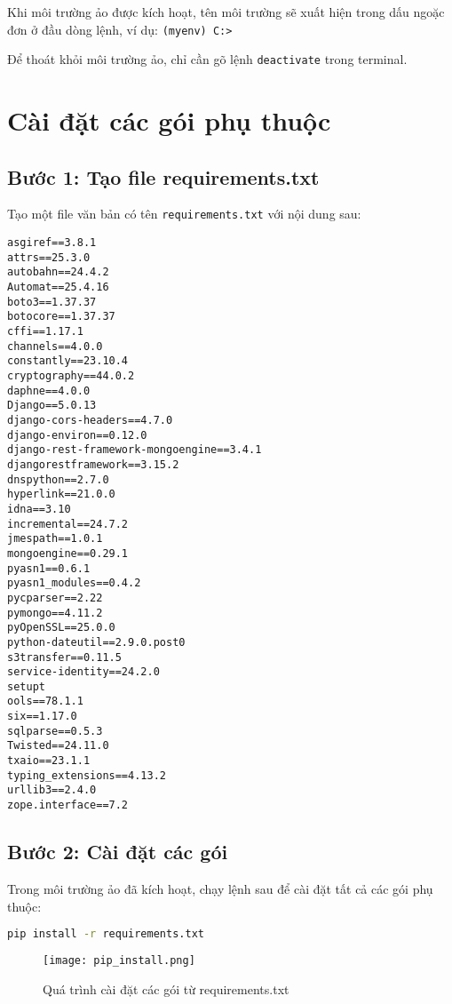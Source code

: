 \documentclass[12pt,a4paper]{article}
\begin{document}
Khi môi trường ảo được kích hoạt, tên môi trường sẽ xuất hiện trong dấu ngoặc đơn ở đầu dòng lệnh, ví dụ: \texttt{(myenv) C:\Users\username>}

\begin{tcolorbox}[colback=blue!5, colframe=blue!40!black, title=Mẹo]
Để thoát khỏi môi trường ảo, chỉ cần gõ lệnh \texttt{deactivate} trong terminal.
\end{tcolorbox}

\section{Cài đặt các gói phụ thuộc}

\subsection{Bước 1: Tạo file requirements.txt}

Tạo một file văn bản có tên \texttt{requirements.txt} với nội dung sau:

\begin{lstlisting}
asgiref==3.8.1
attrs==25.3.0
autobahn==24.4.2
Automat==25.4.16
boto3==1.37.37
botocore==1.37.37
cffi==1.17.1
channels==4.0.0
constantly==23.10.4
cryptography==44.0.2
daphne==4.0.0
Django==5.0.13
django-cors-headers==4.7.0
django-environ==0.12.0
django-rest-framework-mongoengine==3.4.1
djangorestframework==3.15.2
dnspython==2.7.0
hyperlink==21.0.0
idna==3.10
incremental==24.7.2
jmespath==1.0.1
mongoengine==0.29.1
pyasn1==0.6.1
pyasn1_modules==0.4.2
pycparser==2.22
pymongo==4.11.2
pyOpenSSL==25.0.0
python-dateutil==2.9.0.post0
s3transfer==0.11.5
service-identity==24.2.0
setupt
ools==78.1.1
six==1.17.0
sqlparse==0.5.3
Twisted==24.11.0
txaio==23.1.1
typing_extensions==4.13.2
urllib3==2.4.0
zope.interface==7.2
\end{lstlisting}

\subsection{Bước 2: Cài đặt các gói}

Trong môi trường ảo đã kích hoạt, chạy lệnh sau để cài đặt tất cả các gói phụ thuộc:

\begin{lstlisting}[language=bash]
pip install -r requirements.txt
\end{lstlisting}

\begin{figure}[h]
    \centering
    \texttt{[image: pip\_install.png]}
    \caption{Quá trình cài đặt các gói từ requirements.txt}
    \label{fig:pip-install}
\end{figure}
\end{document}

